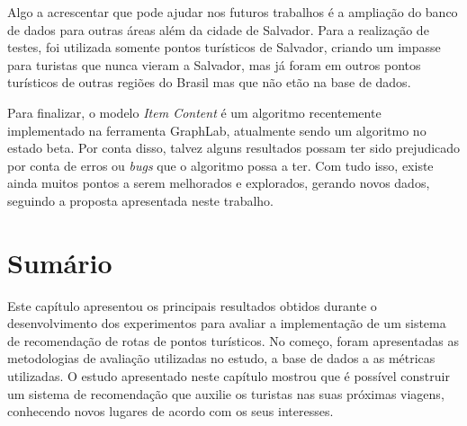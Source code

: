 Algo a acrescentar que pode ajudar nos futuros trabalhos é a ampliação do banco de dados para outras áreas além da cidade de Salvador. Para a realização de testes, foi utilizada somente pontos turísticos de Salvador, criando um impasse para turistas que nunca vieram a Salvador, mas já foram em outros pontos turísticos de outras regiões do Brasil mas que não etão na base de dados.

Para finalizar, o modelo \textit{Item Content} é um algoritmo recentemente implementado na ferramenta GraphLab, atualmente sendo um algoritmo no estado beta. Por conta disso, talvez alguns resultados possam ter sido prejudicado por conta de erros ou \textit{bugs} que o algoritmo possa a ter. Com tudo isso, existe ainda muitos pontos a serem melhorados e explorados, gerando novos dados, seguindo a proposta apresentada neste trabalho.

\section{Sumário}

Este capítulo apresentou os principais resultados obtidos durante o desenvolvimento dos experimentos para avaliar a implementação de um sistema de recomendação de rotas de pontos turísticos. No começo, foram apresentadas as metodologias de avaliação utilizadas no estudo, a base de dados a as métricas utilizadas. O estudo apresentado neste capítulo mostrou que é possível construir um sistema de recomendação que auxilie os turistas nas suas próximas viagens, conhecendo novos lugares de acordo com os seus interesses.